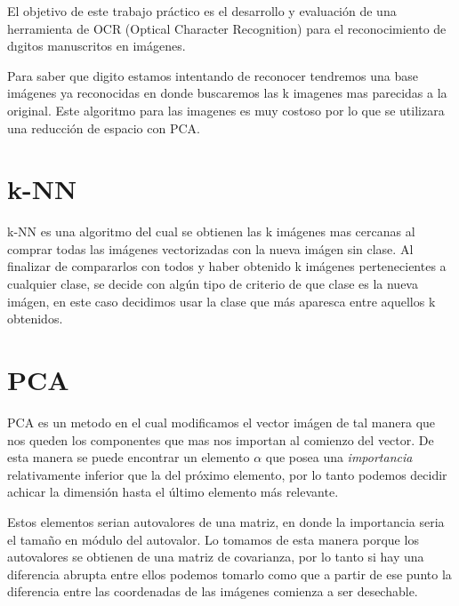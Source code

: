 
El objetivo de este trabajo práctico es el desarrollo y evaluación de una herramienta
de OCR (Optical Character Recognition) para el reconocimiento de dıgitos manuscritos en
imágenes.

Para saber que digito estamos intentando de reconocer tendremos una base imágenes ya reconocidas en donde buscaremos las k imagenes mas parecidas a la original. Este algoritmo para las imagenes es muy costoso por lo que se utilizara una reducción de espacio con PCA.

\section{k-NN}
k-NN es una algoritmo del cual se obtienen las k imágenes mas cercanas al comprar todas las imágenes vectorizadas con la nueva imágen sin clase. Al finalizar de compararlos con todos y haber obtenido k imágenes pertenecientes a cualquier clase, se decide con algún tipo de criterio de que clase es la nueva imágen, en este caso decidimos usar la clase que más aparesca entre aquellos k obtenidos.


\section{PCA}
PCA es un metodo en el cual modificamos el vector imágen de tal manera que nos queden los componentes que mas nos importan al comienzo del vector. De esta manera se puede encontrar un elemento $\alpha$ que posea una \textit{importancia} relativamente inferior que la del próximo elemento, por lo tanto podemos decidir achicar la dimensión hasta el último elemento más relevante. 

Estos elementos serian autovalores de una matriz, en donde la importancia seria el tamaño en módulo del autovalor. Lo tomamos de esta manera porque los autovalores se obtienen de una matriz de covarianza, por lo tanto si hay una diferencia abrupta entre ellos podemos tomarlo como que a partir de ese punto la diferencia entre las coordenadas de las imágenes comienza a ser desechable.
